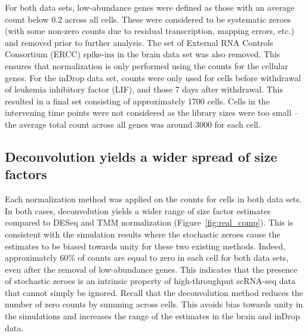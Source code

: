 \documentclass{article}
\begin{document}
For both data sets, low-abundance genes were defined as those with an average count below 0.2 across all cells.
These were considered to be systematic zeroes (with some non-zero counts due to residual transcription, mapping errors, etc.) and removed prior to further analysis.
The set of External RNA Controls Consortium (ERCC) spike-ins in the brain data set was also removed.
This ensures that normalization is only performed using the counts for the cellular genes.
For the inDrop data set, counts were only used for cells before withdrawal of leukemia inhibitory factor (LIF), and those 7 days after withdrawal.
This resulted in a final set consisting of approximately 1700 cells.
Cells in the intervening time points were not considered as the library sizes were too small -- the average total count across all genes was around 3000 for each cell.

\subsection{Deconvolution yields a wider spread of size factors}
Each normalization method was applied on the counts for cells in both data sets.
In both cases, deconvolution yields a wider range of size factor estimates compared to DESeq and TMM normalization (Figure~\ref{fig:real_comp}).
This is consistent with the simulation results where the stochastic zeroes cause the estimates to be biased towards unity for these two existing methods.
Indeed, approximately 60\% of counts are equal to zero in each cell for both data sets, even after the removal of low-abundance genes.
This indicates that the presence of stochastic zeroes is an intrinsic property of high-throughput scRNA-seq data that cannot simply be ignored.
Recall that the deconvolution method reduces the number of zero counts by summing across cells.
This avoids bias towards unity in the simulations and increases the range of the estimates in the brain and inDrop data.

\end{document}
